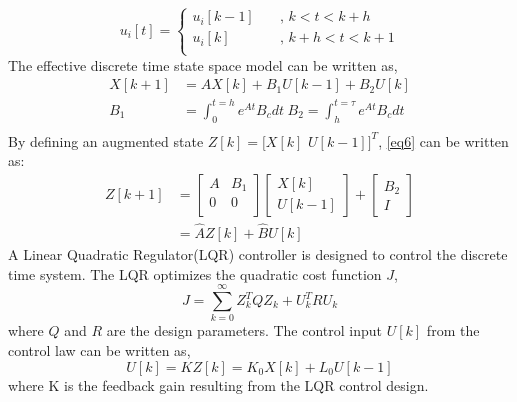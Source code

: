 \documentclass[a4paper]{article}
\begin{document}
\begin{equation}
\label{eq5}
u_{i}[t]  = \begin{cases} u_{i}[k-1] & \quad \text{, } k<t<k+h\\ u_{i}[k] & \quad \text{, } k+h<t<k+1\\ \end{cases}
\end{equation}
The effective discrete time state space model can be written as,
\begin{equation}
\label{eq6}
\begin{split}
X[k+1] &= AX[k] + B_{1}U[k-1] +B_{2}U[k]\\
B_{1}  &= \int_{0}^{t = h}e^{At}B_{c}dt \hspace{3pt} 
B_{2}  = \int_{h}^{t = \tau}e^{At}B_{c}dt\\
\end{split}
\end{equation}
By defining an augmented state $Z[k] = [X[k] $ $U[k-1]]^{T}$, \eqref{eq6} can be written as:
\begin{equation}
\begin{split}
\label{eq7}
Z[k+1] &= 
\begin{bmatrix}
A & B_{1}\\
0 & 0\\
\end{bmatrix} 
\begin{bmatrix}
X[k]\\
U[k-1]
\end{bmatrix}+
\begin{bmatrix}
B_{2}\\
I
\end{bmatrix}\\&=
\hat{A}Z[k] + \hat{B}U[k]
\end{split}
\end{equation}
A Linear Quadratic Regulator(LQR) controller is designed to control the discrete time system. The LQR optimizes the quadratic cost function $J$,
\begin{equation}
\label{eq8}
J = \sum_{k = 0}^{\infty}Z_{k}^{T}QZ_{k} +U_{k}^{T}RU_{k}
\end{equation}
where $Q$ and $R$ are the design parameters. The control input $U[k]$ from the control law can be written as,
\begin{equation}
\label{eq9}
U[k] = KZ[k] = K_{0}X[k] +L_{0}U[k-1]
\end{equation}
where K is the feedback gain resulting from the LQR control design.
\end{document}
